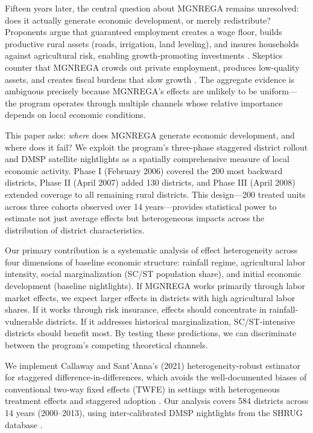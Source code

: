 \documentclass[12pt]{article}
\begin{document}
Fifteen years later, the central question about MGNREGA remains unresolved: does it actually generate economic development, or merely redistribute? Proponents argue that guaranteed employment creates a wage floor, builds productive rural assets (roads, irrigation, land leveling), and insures households against agricultural risk, enabling growth-promoting investments \citep{imbert2015labor, muralidharan2016building}. Skeptics counter that MGNREGA crowds out private employment, produces low-quality assets, and creates fiscal burdens that slow growth \citep{sukhtankar2017sweetening, dutta2012does}. The aggregate evidence is ambiguous precisely because MGNREGA's effects are unlikely to be uniform---the program operates through multiple channels whose relative importance depends on local economic conditions.

This paper asks: \textit{where} does MGNREGA generate economic development, and where does it fail? We exploit the program's three-phase staggered district rollout and DMSP satellite nightlights as a spatially comprehensive measure of local economic activity. Phase I (February 2006) covered the 200 most backward districts, Phase II (April 2007) added 130 districts, and Phase III (April 2008) extended coverage to all remaining rural districts. This design---200 treated units across three cohorts observed over 14 years---provides statistical power to estimate not just average effects but heterogeneous impacts across the distribution of district characteristics.

Our primary contribution is a systematic analysis of effect heterogeneity across four dimensions of baseline economic structure: rainfall regime, agricultural labor intensity, social marginalization (SC/ST population share), and initial economic development (baseline nightlights). If MGNREGA works primarily through labor market effects, we expect larger effects in districts with high agricultural labor shares. If it works through risk insurance, effects should concentrate in rainfall-vulnerable districts. If it addresses historical marginalization, SC/ST-intensive districts should benefit most. By testing these predictions, we can discriminate between the program's competing theoretical channels.

We implement Callaway and Sant'Anna's (2021) heterogeneity-robust estimator for staggered difference-in-differences, which avoids the well-documented biases of conventional two-way fixed effects (TWFE) in settings with heterogeneous treatment effects and staggered adoption \citep{goodman2021difference, dechaisemartin2020two, sun2021estimating}. Our analysis covers 584 districts across 14 years (2000--2013), using inter-calibrated DMSP nightlights from the SHRUG database \citep{asher2021development}.
\end{document}
